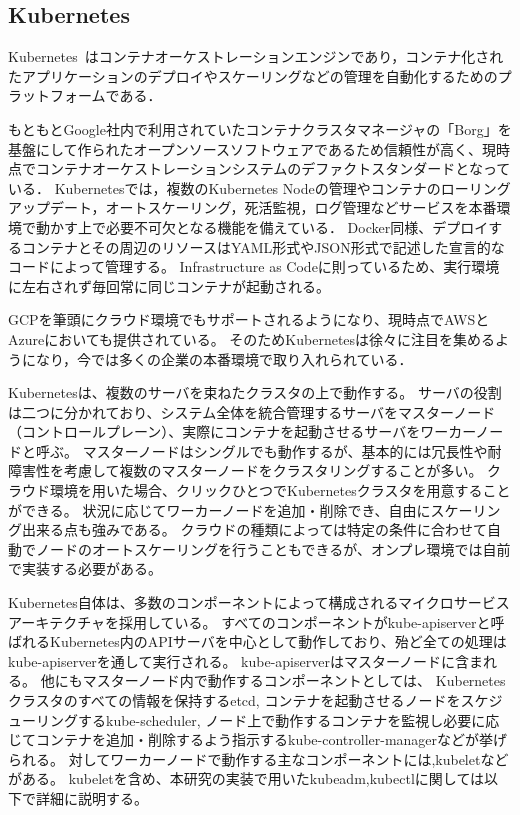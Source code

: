 \subsection{Kubernetes}
\label{background:container-orchestration-system:kubernetes}

Kubernetes~\cite{Kubernetes}はコンテナオーケストレーションエンジンであり，コンテナ化されたアプリケーションのデプロイやスケーリングなどの管理を自動化するためのプラットフォームである．

もともとGoogle社内で利用されていたコンテナクラスタマネージャの「Borg」を基盤にして作られたオープンソースソフトウェアであるため信頼性が高く、現時点でコンテナオーケストレーションシステムのデファクトスタンダードとなっている．
Kubernetesでは，複数のKubernetes Nodeの管理やコンテナのローリングアップデート，オートスケーリング，死活監視，ログ管理などサービスを本番環境で動かす上で必要不可欠となる機能を備えている．
Docker同様、デプロイするコンテナとその周辺のリソースはYAML形式やJSON形式で記述した宣言的なコードによって管理する。
Infrastructure as Codeに則っているため、実行環境に左右されず毎回常に同じコンテナが起動される。

GCPを筆頭にクラウド環境でもサポートされるようになり、現時点でAWSとAzureにおいても提供されている。
そのためKubernetesは徐々に注目を集めるようになり，今では多くの企業の本番環境で取り入れられている．

Kubernetesは、複数のサーバを束ねたクラスタの上で動作する。
サーバの役割は二つに分かれており、システム全体を統合管理するサーバをマスターノード（コントロールプレーン）、実際にコンテナを起動させるサーバをワーカーノードと呼ぶ。
マスターノードはシングルでも動作するが、基本的には冗長性や耐障害性を考慮して複数のマスターノードをクラスタリングすることが多い。
クラウド環境を用いた場合、クリックひとつでKubernetesクラスタを用意することができる。
状況に応じてワーカーノードを追加・削除でき、自由にスケーリング出来る点も強みである。
クラウドの種類によっては特定の条件に合わせて自動でノードのオートスケーリングを行うこともできるが、オンプレ環境では自前で実装する必要がある。

Kubernetes自体は、多数のコンポーネントによって構成されるマイクロサービスアーキテクチャを採用している。
すべてのコンポーネントがkube-apiserverと呼ばれるKubernetes内のAPIサーバを中心として動作しており、殆ど全ての処理はkube-apiserverを通して実行される。
kube-apiserverはマスターノードに含まれる。
他にもマスターノード内で動作するコンポーネントとしては、
Kubernetesクラスタのすべての情報を保持するetcd,
コンテナを起動させるノードをスケジューリングするkube-scheduler,
ノード上で動作するコンテナを監視し必要に応じてコンテナを追加・削除するよう指示するkube-controller-managerなどが挙げられる。
対してワーカーノードで動作する主なコンポーネントには,kubeletなどがある。
kubeletを含め、本研究の実装で用いたkubeadm,kubectlに関しては以下で詳細に説明する。


